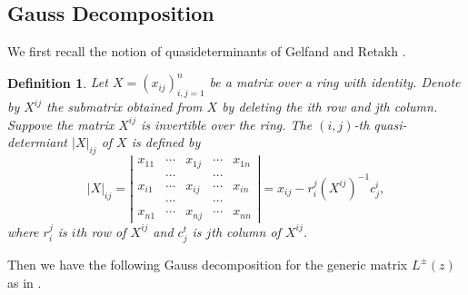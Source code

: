 \documentclass[10pt,a4paper]{amsart}
\newtheorem{defi}[theorem]{Definition}
\numberwithin{equation}{section}
\begin{document}
	\subsection{Gauss Decomposition}
We first recall the notion of quasideterminants of Gelfand and Retakh \cite{GR}.
		\begin{defi}
			Let $X=\left(x_{i j}\right)_{i, j=1}^n$ be a matrix over a ring with identity. Denote by $X^{i j}$ the submatrix obtained from $X$ by deleting the ith row and jth
			column.  Suppove the matrix $X^{i j}$ is invertible over the ring. The $(i, j)$-th quasi-determiant $|X|_{i j}$ of $X$ is defined by
			$$
			|X|_{i j}=\left|\begin{array}{rrrrr}
				x_{11} & \cdots & x_{1 j} & \cdots & x_{1 n} \\
				& \cdots & & \cdots & \\
				x_{i 1} & \cdots & \boxed{x_{i j}} & \cdots & x_{i n} \\
				& \cdots & & \cdots & \\
				x_{n 1} & \cdots & x_{n j} & \cdots & x_{n n}
			\end{array}\right|=x_{i j}-r_i^j\left(X^{i j}\right)^{-1} c_j^i,
			$$
			where $r_i^j$ is $i$th row of $X^{ij}$ and $c_j^t$ is $j$th column of $X^{ij}$.
			\end{defi}
Then we have the following Gauss decomposition for the generic matrix $L^{\pm}(z)$ as in \cite{JLM2}.
\end{document}

